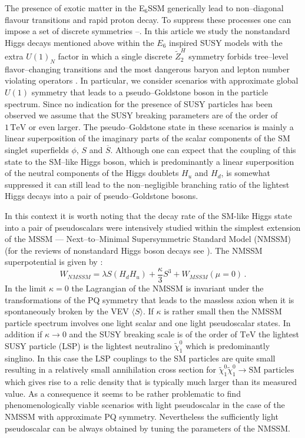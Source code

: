 \documentclass[12pt,a4paper]{article}
\begin{document}
The presence of exotic matter in the E$_6$SSM generically lead to non--diagonal flavour transitions and rapid proton
decay. To suppress these processes one can impose a set of discrete symmetries \cite{King:2005jy}--\cite{King:2005my}.
In this article we study the nonstandard Higgs decays mentioned above within the $E_6$ inspired SUSY models
with the extra $U(1)_{N}$ factor in which a single discrete $\tilde{Z}^{H}_2$ symmetry forbids tree--level
flavor--changing transitions and the most dangerous baryon and lepton number violating operators \cite{nevzorov}.
In particular, we consider scenarios with approximate global $U(1)$ symmetry that leads to a pseudo--Goldstone
boson in the particle spectrum. Since no indication for the presence of SUSY particles has been observed we
assume that the SUSY breaking parameters are of the order of $1\,\mbox{TeV}$ or even larger. The pseudo--Goldstone
state in these scenarios is mainly a linear superposition of the imaginary parts of the scalar components of the
SM singlet superfields $\phi$, $S$ and $\overline{S}$. Although one can expect that the coupling of this state
to the SM--like Higgs boson, which is predominantly a linear superposition of the neutral components of the Higgs
doublets $H_u$ and $H_{d}$, is somewhat suppressed it can still lead to the non--negligible branching ratio of the
lightest Higgs decays into a pair of pseudo--Goldstone bosons.

In this context it is worth noting that the decay rate of the SM-like Higgs state into a pair of pseudoscalars were
intensively studied within the simplest extension of the MSSM ---  Next--to--Minimal Supersymmetric Standard Model
(NMSSM) (for the reviews of nonstandard Higgs boson decays see \cite{Chang:2008cw}). The NMSSM superpotential
is given by \cite{review-nmssm}:
\begin{equation}
W_{NMSSM}=\lambda S(H_d H_u)+\dfrac{\kappa}{3} S^3 + W_{MSSM}(\mu=0)\,.
\label{hd5}
\end{equation}
In the limit $\kappa= 0$ the Lagrangian of the NMSSM is invariant under the transformations of the
PQ symmetry that leads to the massless axion when it is spontaneously broken by the VEV $\langle S\rangle$.
If $\kappa$ is rather small then the NMSSM particle spectrum involves one light scalar and one light pseudoscalar
states. In addition if $\kappa\to 0$ and the SUSY breaking scale is of the order of $\mbox{TeV}$
the lightest SUSY particle (LSP) is the lightest neutralino $\tilde{\chi}^0_1$ which is predominantly singlino.
In this case the LSP couplings to the SM particles are quite small resulting in a relatively small annihilation cross
section for $\tilde{\chi}^0_1\tilde{\chi}^0_1\to \mbox{SM particles}$ which gives rise to a relic density that is
typically much larger than its measured value. As a consequence it seems to be rather problematic to find
phenomenologically viable scenarios with light pseudoscalar in the case of the NMSSM with approximate PQ symmetry.
Nevertheless the sufficiently light pseudoscalar can be always obtained by tuning the parameters of the NMSSM.
\end{document}
